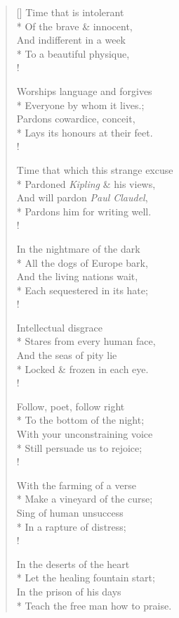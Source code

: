 \documentclass[MAIN]{subfiles}
\begin{document}
\settowidth{\versewidth}{Worships language and forgives}
\begin{verse}[\versewidth]
Time that is intolerant\\*
Of the brave \& innocent,\\
And indifferent in a week\\*
To a beautiful physique,\\!

Worships language and forgives\\*
Everyone by whom it lives.;\\
Pardons cowardice, conceit,\\*
Lays its honours at their feet.\\!

Time that which this strange excuse\\*
Pardoned \emph{Kipling} \& his views,\\
And will pardon \emph{Paul Claudel},\\*
Pardons him for writing well.\\!

In the nightmare of the dark\\*
All the dogs of Europe bark,\\
And the living nations wait,\\*
Each sequestered in its hate;\\!

Intellectual disgrace\\*
Stares from every human face,\\
And the seas of pity lie\\*
Locked \& frozen in each eye.\\!

Follow, poet, follow right\\*
To the bottom of the night;\\
With your unconstraining voice\\*
Still persuade us to rejoice;\\!

With the farming of a verse\\*
Make a vineyard of the curse;\\
Sing of human unsuccess\\*
In a rapture of distress;\\!

In the deserts of the heart\\*
Let the healing fountain start;\\
In the prison of his days\\*
Teach the free man how to praise.
\end{verse}
\end{document}
